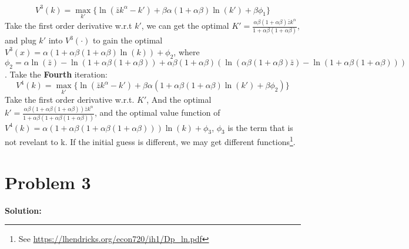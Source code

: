 \documentclass[11pt]{article} %
\begin{document}
\begin{enumerate}[a.]
		\begin{equation*}
			V^3(k)=\max_{k'}\{\ln(\bar{z}k^\alpha-k')+\beta\alpha(1+\alpha\beta)\ln(k')+\beta\phi_1\}
		\end{equation*}	
		Take the first order derivative w.r.t $k'$, we can get the optimal $K'=\frac{\alpha\beta(1+\alpha\beta)\bar{z}k^\alpha}{1+\alpha\beta(1+\alpha\beta)}$, and plug $k'$ into $V^3(\cdot)$ to gain the optimal $V^3(x)=\alpha(1+\alpha\beta(1+\alpha\beta)\ln(k))+\phi_2$, where $\phi_2=\alpha\ln(\bar{z})-\ln(1+\alpha\beta(1+\alpha\beta))+\alpha\beta(1+\alpha\beta)(\ln(\alpha\beta(1+\alpha\beta)\bar{z})-\ln(1+\alpha\beta(1+\alpha\beta)))$.
		Take the \textbf{Fourth} iteration:
		\begin{equation*}
			V^4(k)=\max_{k'}\{\ln(\bar{z}k^\alpha-k')+\beta\alpha(1+\alpha\beta(1+\alpha\beta)\ln(k')+\beta\phi_2)\}
		\end{equation*}
		Take the first order derivative w.r.t. $K'$, And the optimal $k'=\frac{\alpha\beta(1+\alpha\beta(1+\alpha\beta))\bar{z}k^\alpha}{1+\alpha\beta(1+\alpha\beta(1+\alpha\beta))}$, and the optimal value function of $V^4(k)=\alpha(1+\alpha\beta(1+\alpha\beta(1+\alpha\beta)))\ln(k)+\phi_3$, $\phi_3$ is the term that is not revelant to k.
		If the initial guess is different, we may get different functions\footnote{See \url{https://lhendricks.org/econ720/ih1/Dp_ln.pdf}}.
\end{enumerate}







\section{Problem 3}
\textbf{Solution:}
\end{document}
